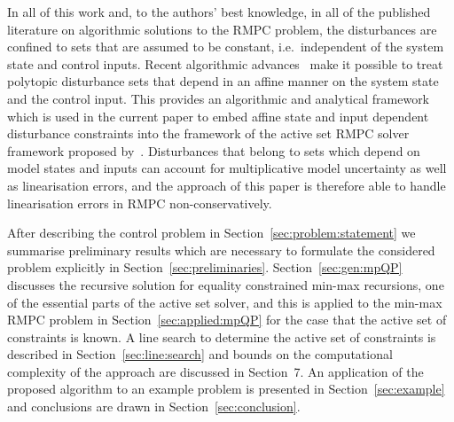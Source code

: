 \documentclass{ifacconf}
\begin{document}
In all of this work and, to the authors' best knowledge, in all of the published literature on algorithmic
solutions to the RMPC problem, the disturbances are confined to sets that are assumed to be constant,
i.e.~independent of the system state and control inputs. Recent algorithmic advances~\citep{Schaich:2015}
make it possible to treat polytopic disturbance sets that depend in an affine manner on the system state and the control
input. This provides an algorithmic and analytical framework which is used in the
current paper to embed affine state and input dependent disturbance constraints into the framework of the
active set RMPC solver framework proposed by~\cite{Buerger:2011}. Disturbances that belong to sets which depend
on model states and inputs can account for multiplicative model uncertainty as well as linearisation
errors, and the approach of this paper is therefore able to handle linearisation errors in RMPC non-conservatively.

After describing the control problem in Section~\ref{sec:problem:statement} we summarise preliminary 
results which are necessary to formulate the considered problem explicitly in Section~\ref{sec:preliminaries}.
Section~\ref{sec:gen:mpQP} discusses the recursive solution for equality constrained min-max recursions, one of 
the essential parts of the active set solver, and this is applied to the min-max RMPC problem in Section~\ref{sec:applied:mpQP}
for the case that the active set of constraints is known. A line search to determine the active set of
constraints is described 
in Section~\ref{sec:line:search} and bounds on the computational complexity of the approach are discussed in
Section~7. An application of the proposed algorithm to an example problem is presented in 
Section~\ref{sec:example} and conclusions are drawn in Section~\ref{sec:conclusion}.
\end{document}
